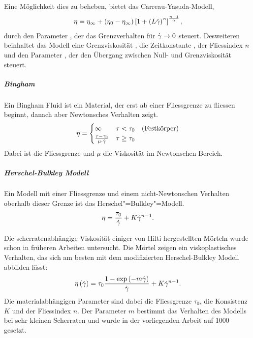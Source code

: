 Eine Möglichkeit dies zu beheben, bietet das Carreau-Yasuda-Modell,
\begin{equation}
    \eta=\eta_\infty+\left( \eta_0-\eta_\infty \right)\left[ 1+\left( L\dot\gamma \right)^\alpha \right] ^{\frac{n-1}{\alpha}},
    \label{eq:fg:carreauyasuda}
\end{equation}
durch den Parameter , der das Grenzverhalten für $\dot\gamma\rightarrow0$ steuert. Desweiteren beinhaltet das Modell eine Grenzviskosität , die Zeitkonstante , der Fliessindex $n$ und den Parameter , der den Übergang zwischen Null- und Grenzviskosität steuert.
%
\subparagraph{Bingham}
Ein Bingham Fluid ist ein Material, der erst ab einer Fliessgrenze zu fliessen beginnt, danach aber Newtonsches Verhalten zeigt.
\begin{equation}
    \eta=
    \begin{cases}
        \infty                           & \tau<\tau_{0}    \quad \text{(Festkörper)}\\
        \frac{\tau-\tau_{0}}{\mu\cdot\dot\gamma} & \tau\geq\tau_{0}
    \end{cases}
    \label{eq:fg:bingham}
\end{equation}
Dabei ist  die Fliessgrenze und $\mu$ die Viskosität im Newtonschen Bereich.
%
\subparagraph{Herschel-Bulkley Modell}
Ein Modell mit einer Fliessgrenze und einem nicht-Newtonschen Verhalten oberhalb dieser Grenze ist das Herschel"=Bulkley"=Modell.
\begin{equation}
    \eta=  \frac{\tau_0}{\dot\gamma}+K\dot\gamma^{n-1}.
    \label{eq:fg:herschelbulkley}
\end{equation}

Die scherratenabhängige Viskosität einiger von Hilti hergestellten Mörteln wurde schon in früheren Arbeiten untersucht.
Die Mörtel zeigen ein viskoplastisches Verhalten, das sich am besten mit dem modifizierten Herschel-Bulkley Modell abbilden lässt:
\begin{equation}
    \label{eq:modHB}
    \eta\left( \dot\gamma \right) = \tau_0 \frac{1-\exp \left( -m\dot\gamma \right)}{\dot\gamma}+K\dot\gamma^{n-1}.
\end{equation}
Die materialabhängigen Parameter sind dabei die Fliessgrenze $\tau_0$, die Konsistenz $K$ und der Fliessindex $n$. Der Parameter $m$ bestimmt das Verhalten des Modells bei sehr kleinen Scherraten und wurde in der vorliegenden Arbeit auf 1000 gesetzt.%
%
